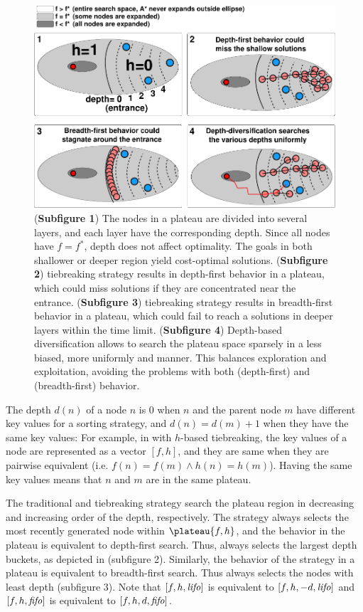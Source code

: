 \begin{figure}[htbp]
  \centering
  \includegraphics{img/astar/plateau-2.pdf}
 \caption{(\textbf{Subfigure 1}) The nodes in a plateau are divided into several layers, and each layer have the corresponding depth. Since all nodes have $f=f^*$, depth does not affect optimality. The goals in both shallower or deeper region yield cost-optimal solutions.
 (\textbf{Subfigure 2}) \lifo tiebreaking strategy results in depth-first behavior in a
 plateau, which could miss solutions if they are concentrated near the entrance.
 (\textbf{Subfigure 3}) \fifo tiebreaking strategy results in  breadth-first behavior in a
 plateau, which could fail to reach a solutions in deeper layers within the time limit.
 (\textbf{Subfigure 4}) Depth-based diversification allows \astar to search the plateau space
 sparsely in a less biased, more uniformly and manner. This balances exploration and exploitation, avoiding the problems with both \lifo (depth-first) and \fifo (breadth-first) behavior.
 }
 \label{fig:plateau-depiction}
\end{figure}

The depth $d(n)$ of a
node $n$ is 0 when $n$ and the parent node $m$ have different key
values for a sorting strategy, and $d(n)=d(m)+1$ when they have the same
key values: For example, in \astar with $h$-based tiebreaking, the key
values of a node are represented as a vector $[f,h]$, and they are same
when they are pairwise equivalent (i.e. $f(n) = f(m) \land h(n) =
h(m)$).  Having the same key values means that $n$ and $m$ are in the
same plateau.

The traditional \lifo and \fifo tiebreaking strategy 
search the plateau region in decreasing and increasing order of the depth, respectively.
The \lifo strategy always selects the most recently generated node
within $\plateau{f,h}$, and the behavior in the plateau is equivalent to depth-first search.
Thus, \lifo always selects the largest depth
buckets, as depicted in  (subfigure 2).
Similarly, the behavior of the \fifo strategy 
in a plateau is equivalent to breadth-first search. Thus \fifo 
always selects the nodes with least depth (subfigure 3).
Note that  $[f,h,{\text{\textit{lifo}}}]$ is equivalent to $[f,h,-d,{\text{\textit{lifo}}}]$ and
$[f,h,{\text{\textit{fifo}}}]$ is equivalent to $[f,h,d,{\text{\textit{fifo}}}]$.

